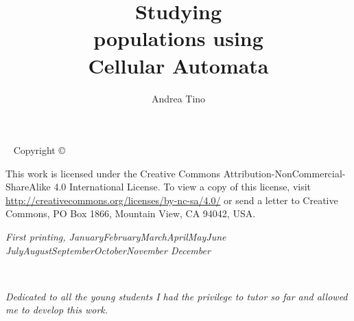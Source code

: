 \documentclass[twoside,symmetric,justified]{tufte-book}
\title{Studying\\populations using\\Cellular Automata}
\author[Andrea Tino]{Andrea Tino}
\newcommand{\monthyear}{%
  \ifcase\month\or January\or February\or March\or April\or May\or June\or
  July\or August\or September\or October\or November\or
  December\fi\space\number\year
}
\begin{document}
\frontmatter


\maketitle


\newpage
\begin{fullwidth}
~\vfill
\thispagestyle{empty}
\setlength{\parindent}{0pt}
\setlength{\parskip}{\baselineskip}
Copyright \copyright\ \the\year\ \thanklessauthor

\par{}

\par{}

\par This work is licensed under the Creative Commons Attribution-NonCommercial-ShareAlike
4.0 International License. To view a copy of this license, 
visit \url{http://creativecommons.org/licenses/by-nc-sa/4.0/} or send a letter to
Creative Commons,
PO Box 1866, Mountain View, CA 94042, USA.

\par\textit{First printing, \monthyear}
\end{fullwidth}

\tableofcontents

\listoffigures

\listoftables

\cleardoublepage
~\vfill
\begin{doublespace}
\noindent\fontsize{18}{22}\selectfont\itshape
\nohyphenation
Dedicated to all the young students I had the privilege to tutor
so far and allowed me to develop this work.
\end{doublespace}
\vfill
\vfill


\cleardoublepage

\mainmatter

















\backmatter




\printindex
\end{document}
